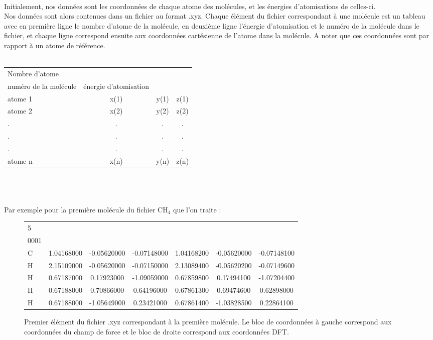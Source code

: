 \documentclass[a4paper,12pt,titlepage]{report}
\begin{document}
\paragraph{}
Initialement, nos données sont les coordonnées de chaque atome des molécules, et  les énergies d'atomisations de celles-ci. \\
Nos données sont alors contenues dans un fichier au format .xyz.
Chaque élément du fichier correspondant à une molécule est un tableau avec en première ligne le nombre d'atome de la molécule, en deuxième ligne l'énergie d'atomisation et le numéro de la molécule dans le fichier, et chaque ligne correspond ensuite aux coordonnées cartésienne de l'atome dans la molécule. A noter que ces coordonnées sont par rapport à un atome de référence.\\
\\
\begin{tabular}{ l c c c }
   Nombre d'atome &  & & \quad\\
   numéro de la molécule &\quad énergie d'atomisation &\quad &\\
   atome 1 & x(1) & y(1) & \quad z(1) \\
   atome 2 & x(2) & y(2) & \quad z(2) \\
   . & . & . & \quad . \\
   . & . & . & \quad . \\
   . & . & . & \quad . \\
   atome n & x(n) & y(n) &\quad  z(n) \\
 \end{tabular}
 \\
 \\
 \\
 Par exemple pour la première  molécule du fichier CH$_4$ que l'on traite :
\begin{figure}[!h]
\begin{tabular}{ l c c c c c c}
   5 &  & & \quad\\
   0001 &\quad -417.031 & & & & & \\
   C & 1.04168000 & -0.05620000 & -0.07148000 & 1.04168200 & -0.05620000 & -0.07148100\\
   H  & 2.15109000 & -0.05620000 & -0.07150000 & 2.13089400 & -0.05620200 & -0.07149600\\
   H  & 0.67187000 & 0.17923000 & -1.09059000  &  0.67859800 &  0.17494100 & -1.07204400\\
   H & 0.67188000 & 0.70866000 & 0.64196000 & 0.67861300 &  0.69474600  & 0.62898000\\
   H & 0.67188000 & -1.05649000 & 0.23421000 & 0.67861400 & -1.03828500  &0.22864100\\
 \end{tabular}
 \caption{Premier élément du fichier .xyz correspondant à la première molécule. Le bloc de coordonnées à gauche correspond aux coordonnées du champ de force et le bloc de droite correspond aux coordonnées DFT.}
 \end{figure}
 
\end{document}
